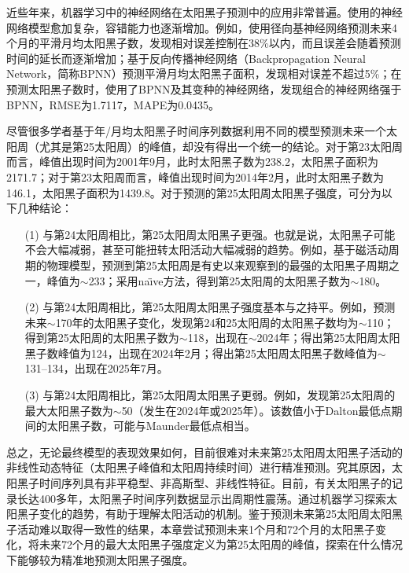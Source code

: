 近些年来，机器学习中的神经网络在太阳黑子预测中的应用非常普遍\citep{pala2019forecasting}。使用的神经网络模型愈加复杂，容错能力也逐渐增加。例如，\citet{zhao2008prediction}使用径向基神经网络预测未来4个月的平滑月均太阳黑子数，发现相对误差控制在38\%以内，而且误差会随着预测时间的延长而逐渐增加；\citet{ding2012prediction}基于反向传播神经网络（Backpropagation Neural Network，简称BPNN）预测平滑月均太阳黑子面积，发现相对误差不超过5\%；\citet{li2018hybrid}在预测太阳黑子数时，使用了BPNN及其变种的神经网络，发现组合的神经网络强于BPNN，RMSE为1.7117，MAPE为0.0435。

尽管很多学者基于年/月均太阳黑子时间序列数据利用不同的模型预测未来一个太阳周（尤其是第25太阳周）的峰值，却没有得出一个统一的结论。对于第23太阳周而言，峰值出现时间为2001年9月，此时太阳黑子数为238.2，太阳黑子面积为2171.7；对于第23太阳周而言，峰值出现时间为2014年2月，此时太阳黑子数为146.1，太阳黑子面积为1439.8。对于预测的第25太阳周太阳黑子强度，可分为以下几种结论：
\begin{enumerate}
  \item[(1)] 与第24太阳周相比，第25太阳周太阳黑子更强。也就是说，太阳黑子可能不会大幅减弱，甚至可能扭转太阳活动大幅减弱的趋势。例如，\citet{mcintosh2020overlapping}基于磁活动周期的物理模型，预测到第25太阳周是有史以来观察到的最强的太阳黑子周期之一，峰值为$\sim$233；\citet{pesnell2018effects}采用na{\"\i}ve方法，得到第25太阳周的太阳黑子数为$\sim$180。
  \item[(2)] 与第24太阳周相比，第25太阳周太阳黑子强度基本与之持平。例如，\citet{hiremath2008prediction}预测未来$\sim$170年的太阳黑子变化，发现第24和25太阳周的太阳黑子数均为$\sim$110；\citet{bhowmik2018prediction}得到第25太阳周的太阳黑子数为$\sim$118，出现在$\sim$2024年；\citet{singh2019prediction}得出第25太阳周太阳黑子数峰值为124，出现在2024年2月；\citet{bisoi2020another}得出第25太阳周太阳黑子数峰值为$\sim$131--134，出现在2025年7月。
  \item[(3)] 与第24太阳周相比，第25太阳周太阳黑子更弱。例如，\citet{kitiashvili2020application}发现第25太阳周的最大太阳黑子数为$\sim$50（发生在2024年或2025年）。该数值小于Dalton最低点期间的太阳黑子数，可能与Maunder最低点相当。
\end{enumerate}

总之，无论最终模型的表现效果如何，目前很难对未来第25太阳周太阳黑子活动的非线性动态特征（太阳黑子峰值和太阳周持续时间）进行精准预测。究其原因，太阳黑子时间序列具有非平稳型、非高斯型、非线性特征。目前，有关太阳黑子的记录长达400多年，太阳黑子时间序列数据显示出周期性震荡。通过机器学习探索太阳黑子变化的趋势，有助于理解太阳活动的机制。鉴于预测未来第25太阳周太阳黑子活动难以取得一致性的结果，本章尝试预测未来1个月和72个月的太阳黑子变化，将未来72个月的最大太阳黑子强度定义为第25太阳周的峰值，探索在什么情况下能够较为精准地预测太阳黑子强度。

